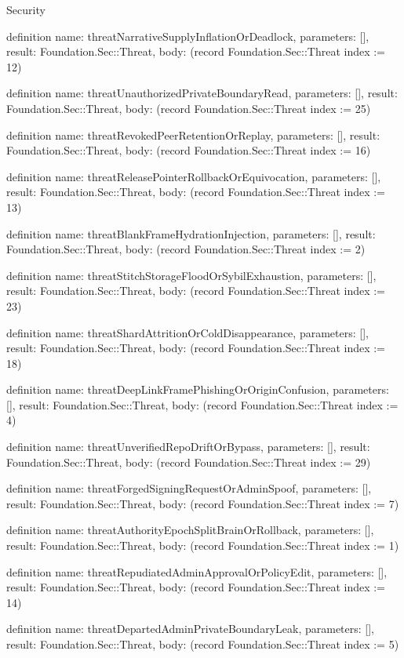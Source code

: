 \begin{lexlean}{Security}
\begin{semanticmodule}
definition{
  name: threatNarrativeSupplyInflationOrDeadlock,
  parameters: [],
  result: Foundation.Sec::Threat,
  body: (record Foundation.Sec::Threat {index := 12})
}

definition{
  name: threatUnauthorizedPrivateBoundaryRead,
  parameters: [],
  result: Foundation.Sec::Threat,
  body: (record Foundation.Sec::Threat {index := 25})
}

definition{
  name: threatRevokedPeerRetentionOrReplay,
  parameters: [],
  result: Foundation.Sec::Threat,
  body: (record Foundation.Sec::Threat {index := 16})
}

definition{
  name: threatReleasePointerRollbackOrEquivocation,
  parameters: [],
  result: Foundation.Sec::Threat,
  body: (record Foundation.Sec::Threat {index := 13})
}

definition{
  name: threatBlankFrameHydrationInjection,
  parameters: [],
  result: Foundation.Sec::Threat,
  body: (record Foundation.Sec::Threat {index := 2})
}

definition{
  name: threatStitchStorageFloodOrSybilExhaustion,
  parameters: [],
  result: Foundation.Sec::Threat,
  body: (record Foundation.Sec::Threat {index := 23})
}

definition{
  name: threatShardAttritionOrColdDisappearance,
  parameters: [],
  result: Foundation.Sec::Threat,
  body: (record Foundation.Sec::Threat {index := 18})
}

definition{
  name: threatDeepLinkFramePhishingOrOriginConfusion,
  parameters: [],
  result: Foundation.Sec::Threat,
  body: (record Foundation.Sec::Threat {index := 4})
}

definition{
  name: threatUnverifiedRepoDriftOrBypass,
  parameters: [],
  result: Foundation.Sec::Threat,
  body: (record Foundation.Sec::Threat {index := 29})
}

definition{
  name: threatForgedSigningRequestOrAdminSpoof,
  parameters: [],
  result: Foundation.Sec::Threat,
  body: (record Foundation.Sec::Threat {index := 7})
}

definition{
  name: threatAuthorityEpochSplitBrainOrRollback,
  parameters: [],
  result: Foundation.Sec::Threat,
  body: (record Foundation.Sec::Threat {index := 1})
}

definition{
  name: threatRepudiatedAdminApprovalOrPolicyEdit,
  parameters: [],
  result: Foundation.Sec::Threat,
  body: (record Foundation.Sec::Threat {index := 14})
}

definition{
  name: threatDepartedAdminPrivateBoundaryLeak,
  parameters: [],
  result: Foundation.Sec::Threat,
  body: (record Foundation.Sec::Threat {index := 5})
}


\end{semanticmodule}
\end{lexlean}
